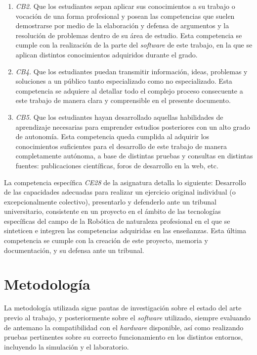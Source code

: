 \begin{enumerate}
    \item{\textit{CB2.} Que los estudiantes sepan aplicar sus conocimientos a su
        trabajo o vocación de una forma profesional y posean las competencias
        que suelen demostrarse por medio de la elaboración y defensa de
        argumentos y la resolución de problemas dentro de su área de estudio.}
        Esta competencia se cumple con la realización de la parte del
        \textit{software} de este trabajo, en la que se aplican distintos
        conocimientos adquiridos durante el grado.
    \item{\textit{CB4.} Que los estudiantes puedan transmitir información,
        ideas, problemas y soluciones a un público tanto especializado como no
        especializado.}
        Esta competencia se adquiere al detallar todo el complejo proceso
        consecuente a este trabajo de manera clara y comprensible en el presente
        documento.
    \item{\textit{CB5.} Que los estudiantes hayan desarrollado aquellas
        habilidades de aprendizaje necesarias para emprender estudios
        posteriores con un alto grado de autonomía.}
        Esta competencia queda cumplida al adquirir los conocimientos
        suficientes para el desarrollo de este trabajo de manera completamente
        autónoma, a base de distintas pruebas y consultas en distintas fuentes:
        publicaciones científicas, foros de desarrollo en la web, etc.
\end{enumerate}

La competencia específica \textit{CE28} de la asignatura detalla lo
siguiente:
Desarrollo de las capacidades adecuadas para realizar un ejercicio original
individual (o excepcionalmente colectivo), presentarlo y defenderlo ante un
tribunal universitario, consistente en un proyecto en el ámbito de las
tecnologías específicas del campo de la Robótica de naturaleza profesional en el
que se sinteticen e integren las competencias adquiridas en las enseñanzas.
Esta última competencia se cumple con la creación de este proyecto, memoria y
documentación, y su defensa ante un tribunal.


\section{Metodología}
\label{sec:metodologia}

La metodología utilizada sigue pautas de investigación sobre el estado del arte
previo al trabajo, y posteriormente sobre el \textit{software} utilizado,
siempre evaluando de antemano la compatibilidad con el \textit{hardware}
disponible, así como realizando pruebas pertinentes sobre su correcto
funcionamiento en los distintos entornos, incluyendo la simulación y el
laboratorio.


